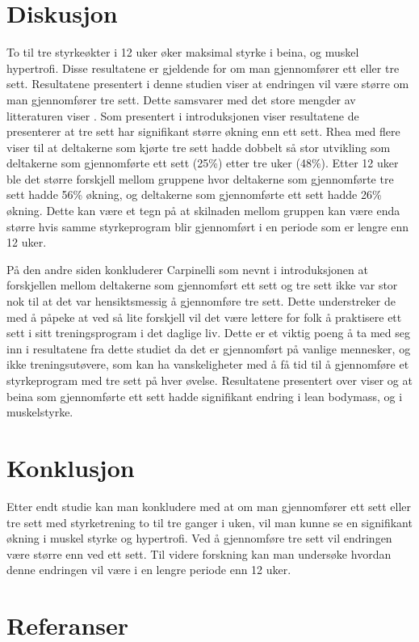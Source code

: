 \documentclass[
]{book}
\begin{document}
\hypertarget{diskusjon-1}{%
\section{Diskusjon}\label{diskusjon-1}}

To til tre styrkeøkter i 12 uker øker maksimal styrke i beina, og muskel hypertrofi. Disse resultatene er gjeldende for om man gjennomfører ett eller tre sett. Resultatene presentert i denne studien viser at endringen vil være større om man gjennomfører tre sett. Dette samsvarer med det store mengder av litteraturen viser \citep{rhea2002, munn2005, fröhlich2010}. Som presentert i introduksjonen viser resultatene de presenterer at tre sett har signifikant større økning enn ett sett. Rhea med flere viser til at deltakerne som kjørte tre sett hadde dobbelt så stor utvikling som deltakerne som gjennomførte ett sett (25\%) etter tre uker (48\%). Etter 12 uker ble det større forskjell mellom gruppene hvor deltakerne som gjennomførte tre sett hadde 56\% økning, og deltakerne som gjennomførte ett sett hadde 26\% økning. Dette kan være et tegn på at skilnaden mellom gruppen kan være enda større hvis samme styrkeprogram blir gjennomført i en periode som er lengre enn 12 uker.

På den andre siden konkluderer Carpinelli \citep{carpinelli1998} som nevnt i introduksjonen at forskjellen mellom deltakerne som gjennomført ett sett og tre sett ikke var stor nok til at det var hensiktsmessig å gjennomføre tre sett. Dette understreker de med å påpeke at ved så lite forskjell vil det være lettere for folk å praktisere ett sett i sitt treningsprogram i det daglige liv. Dette er et viktig poeng å ta med seg inn i resultatene fra dette studiet da det er gjennomført på vanlige mennesker, og ikke treningsutøvere, som kan ha vanskeligheter med å få tid til å gjennomføre et styrkeprogram med tre sett på hver øvelse. Resultatene presentert over viser og at beina som gjennomførte ett sett hadde signifikant endring i lean bodymass, og i muskelstyrke.

\hypertarget{konklusjon}{%
\section{Konklusjon}\label{konklusjon}}

Etter endt studie kan man konkludere med at om man gjennomfører ett sett eller tre sett med styrketrening to til tre ganger i uken, vil man kunne se en signifikant økning i muskel styrke og hypertrofi. Ved å gjennomføre tre sett vil endringen være større enn ved ett sett. Til videre forskning kan man undersøke hvordan denne endringen vil være i en lengre periode enn 12 uker.

\hypertarget{referanser-3}{%
\section{Referanser}\label{referanser-3}}

  
\end{document}
